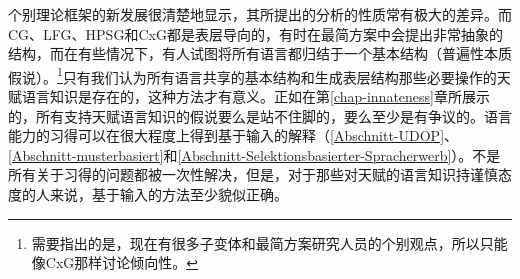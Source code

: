 个别理论框架的新发展很清楚地显示，其所提出的分析的性质常有极大的差异。而CG、LFG、HPSG和CxG都是表层导向的，有时在最简方案中会提出非常抽象的结构，而在有些情况下，有人试图将所有语言都归结于一个基本结构（普遍性本质假说）。\footnote{%
需要指出的是，现在有很多子变体和最简方案研究人员的个别观点，所以只能像CxG那样讨论倾向性。
}只有我们认为所有语言共享的基本结构和生成表层结构那些必要操作的天赋语言知识是存在的，这种方法才有意义。正如在第\ref{chap-innateness}章所展示的，所有支持天赋语言知识的假说要么是站不住脚的，要么至少是有争议的。语言能力的习得可以在很大程度上得到基于输入的解释（\ref{Abschnitt-UDOP}、\ref{Abschnitt-musterbasiert}和\ref{Abschnitt-Selektionsbasierter-Spracherwerb}）。不是所有关于习得的问题都被一次性解决，但是，对于那些对天赋的语言知识持谨慎态度的人来说，基于输入的方法至少貌似正确。

